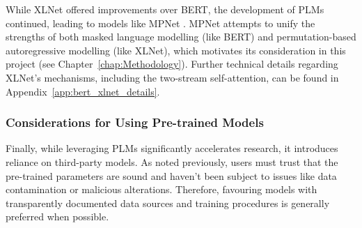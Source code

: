 \documentclass[10pt,oneside]{report}
\begin{document}
While XLNet offered improvements over BERT, the development of PLMs continued, leading to models like MPNet \cite{song2020mpnet}. MPNet attempts to unify the strengths of both masked language modelling (like BERT) and permutation-based autoregressive modelling (like XLNet), which motivates its consideration in this project (see Chapter~\ref{chap:Methodology}). Further technical details regarding XLNet's mechanisms, including the two-stream self-attention, can be found in Appendix~\ref{app:bert_xlnet_details}.

\subsubsection{Considerations for Using Pre-trained Models}

Finally, while leveraging PLMs significantly accelerates research, it introduces reliance on third-party models. As noted previously, users must trust that the pre-trained parameters are sound and haven't been subject to issues like data contamination or malicious alterations. Therefore, favouring models with transparently documented data sources and training procedures is generally preferred when possible.


\end{document}
